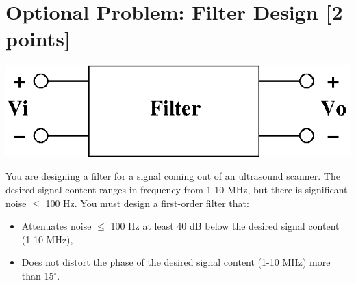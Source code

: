 %

\section*{Optional Problem: Filter Design [2 points]}
\begin{center}
\includegraphics[width=0.4\linewidth]{hpf/hpf.eps}
\end{center}

You are designing a filter for a signal coming out of an ultrasound scanner.
The desired signal content ranges in frequency from 1-10 MHz, but there is
significant noise $\leq$ 100 Hz.  You must design a \underline{first-order}
filter that:

\begin{itemize}
\item Attenuates noise $\leq$ 100 Hz at least 40 dB below the desired
signal content (1-10 MHz), 
\item Does not distort the phase of the desired signal content (1-10 MHz) more than 15$^\circ$.
\end{itemize}

